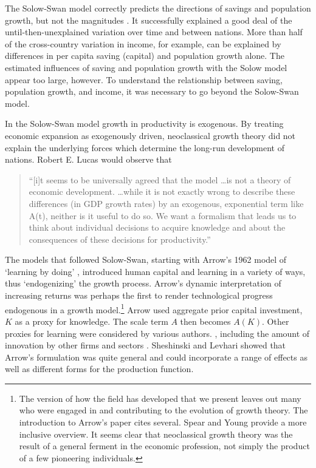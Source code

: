 The \gls{Solow-Swan model} correctly predicts the directions of savings and population growth, but not the magnitudes \cite{mankiwContributionEmpiricsEconomic1992}. It successfully explained a good deal of the until-then-unexplained variation over time and between nations. More than half of the cross-country variation in income, for example,  can be explained by differences in per capita saving (capital) and population growth alone. The estimated influences of saving and population growth with the Solow model appear too large, however. To understand the relationship between saving, population growth, and income, it was necessary to go beyond the  Solow-Swan model.

In the Solow-Swan model growth in productivity is exogenous. By treating economic expansion as exogenously driven, neoclassical growth theory did not explain %
the underlying forces which determine the long-run development of nations.   Robert E. Lucas \cite{lucasMechanicsEconomicDevelopment1988} would observe that \begin{quotation}
``[i]t seems to be universally agreed that the model \dots is not a theory of economic development.   \dots while it is not exactly wrong to describe these differences (in GDP  growth rates) by an exogenous, exponential term like A(t), neither is it useful to do so. We want a formalism that leads us to think about individual decisions to acquire knowledge and about the consequences of these decisions for productivity.'' \end{quotation}


The models that followed Solow-Swan, starting with Arrow's 1962 model of `learning by doing' \cite{arrowEconomicImplicationsLearning1962}, introduced \gls{human capital} and learning in a variety of ways, thus `endogenizing' the growth process.  Arrow's  dynamic interpretation of increasing returns was perhaps the first to render technological progress endogenous in a growth model.\footnote{The version of how the field has developed that we present leaves out many who were engaged in and contributing to the evolution of growth theory. The introduction to  Arrow's paper cites several. Spear and Young \cite{spearMACROECONOMICDYNAMICSSURVEY2018} provide a more inclusive overview. It seems clear that neoclassical growth theory was the result of a general ferment in the economic profession, not simply the product of a few pioneering individuals.} 
Arrow used  aggregate prior capital investment, $K$  as a proxy for knowledge. The scale term $A$ then becomes $A(K)$.  
Other proxies for learning were considered by various authors.  \cite{levhariExtensionsArrowLearning1966, sheshinskiOptimalAccumulationLearning1967}, including the amount of innovation by other firms and sectors  \cite{kingEndogenousGrowthRole1989}. Sheshinski and Levhari showed that Arrow's formulation was quite general and could incorporate a range of effects as well as different forms for the production function.


